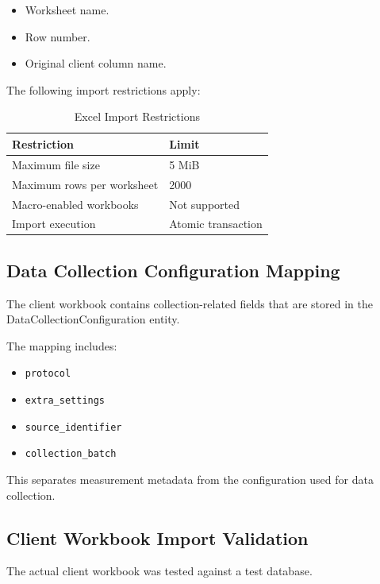 \documentclass[11pt,a4paper]{article}
\begin{document}
\begin{itemize}
    \item Worksheet name.
    \item Row number.
    \item Original client column name.
\end{itemize}

The following import restrictions apply:

\begin{table}[htbp]
\centering
\caption{Excel Import Restrictions}
\label{tab:phase3_import_limits}
\begin{tabularx}{\textwidth}{P{5cm} L}
\toprule
\textbf{Restriction} & \textbf{Limit} \\
\midrule
Maximum file size & 5 MiB \\
Maximum rows per worksheet & 2000 \\
Macro-enabled workbooks & Not supported \\
Import execution & Atomic transaction \\
\bottomrule
\end{tabularx}
\end{table}

\subsection{Data Collection Configuration Mapping}

The client workbook contains collection-related
fields that are stored in the
DataCollectionConfiguration entity.

The mapping includes:

\begin{itemize}
    \item \texttt{protocol}
    \item \texttt{extra\_settings}
    \item \texttt{source\_identifier}
    \item \texttt{collection\_batch}
\end{itemize}

This separates measurement metadata
from the configuration used for
data collection.

\subsection{Client Workbook Import Validation}

The actual client workbook was tested
against a test database.
\end{document}
